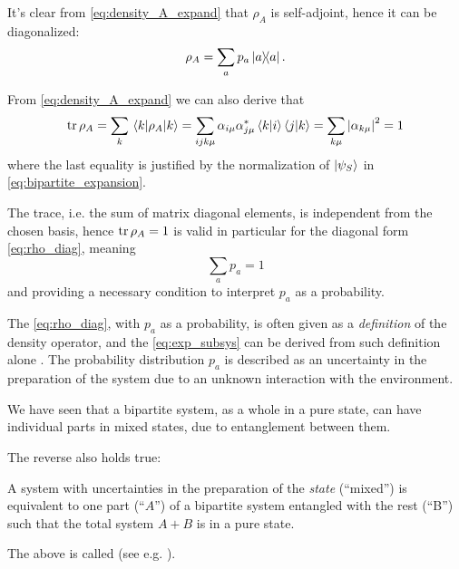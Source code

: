 It's clear from \eqref{eq:density_A_expand} that $\rho_A$ is self-adjoint,
hence it can be diagonalized:
\begin{equation}\label{eq:rho_diag}
  \rho_A = \sum_a p_a \ketbra{a}{a} \text{.}
\end{equation}

From \eqref{eq:density_A_expand} we can also derive that
\begin{equation}
  \tr\rho_A = \sum_k \mel{k}{\rho_A}{k} =
    \sum_{ijk\mu}\alpha_{i\mu}\alpha_{j\mu}^{*}\braket{k}{i}\braket{j}{k} =
    \sum_{k\mu}\abs{\alpha_{k\mu}}^2 = 1
\end{equation}
where the last equality is justified by the normalization of $\ket{\psi_S}$
in \eqref{eq:bipartite_expansion}.

The trace, i.e. the sum of matrix diagonal elements, is independent
from the chosen basis, hence $\tr\rho_A = 1$ is valid in particular
for the diagonal form \eqref{eq:rho_diag}, meaning
\[
  \sum_a p_a = 1
\]
and providing a necessary condition to interpret $p_a$ as a probability.

The \eqref{eq:rho_diag}, with $p_a$ as a probability, is often
given as a \emph{definition} of the density operator,
and the \eqref{eq:exp_subsys} can be derived from
such definition alone \parencite{open_systems}.
The probability distribution ${p_a}$
is described as an uncertainty in the preparation of the system
due to an unknown interaction with the environment.

We have seen that a bipartite system, as a whole in a pure state,
can have individual parts in mixed states, due to entanglement between them.

The reverse also holds true:
\begin{proposition}
A system with uncertainties in the preparation of the \emph{state}
(``mixed'') is equivalent to one part (``$A$'') of a bipartite system
entangled with the rest (``B'') such that the total system
$A+B$ is in a pure state.
\end{proposition}

The above is called  (see e.g. \cite[sec.2.5]{NielsenChuang}).

